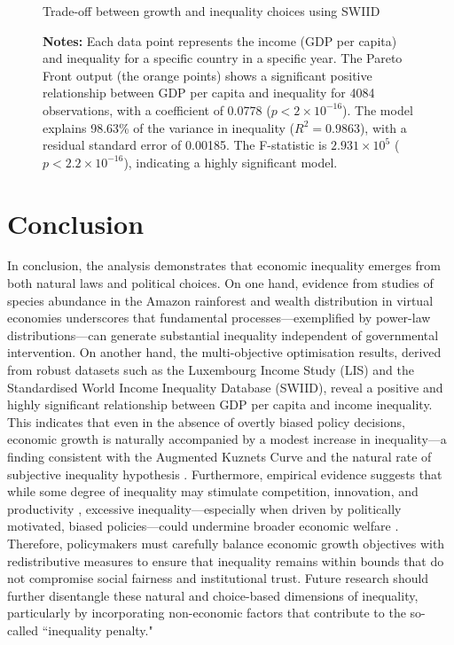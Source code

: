 \documentclass[12pt]{article}
\begin{document}
\begin{figure}[H]
    \centering
    \scalebox{0.6}{}
    \caption{Trade-off between growth and inequality choices using SWIID}
    \label{fig:swiid}
    \captionsetup{font=footnotesize}
    \caption*{\textbf{Notes:} Each data point represents the income (GDP per capita) and inequality for a specific country in a specific year. The Pareto Front output (the orange points) shows a significant positive relationship between GDP per capita and inequality for 4084 observations, with a coefficient of 0.0778 (\( p < 2 \times 10^{-16} \)). The model explains 98.63\% of the variance in inequality (\( R^2 = 0.9863 \)), with a residual standard error of 0.00185. The F-statistic is \( 2.931 \times 10^5 \) (\( p < 2.2 \times 10^{-16} \)), indicating a highly significant model.}
\end{figure}

\section{Conclusion} 

In conclusion, the analysis demonstrates that economic inequality emerges from both natural laws and political choices. On one hand, evidence from studies of species abundance in the Amazon rainforest \parencite{scheffer2017inequality} and wealth distribution in virtual economies \parencite{fuchs2014behavioral} underscores that fundamental processes—exemplified by power-law distributions—can generate substantial inequality independent of governmental intervention. On another hand, the multi-objective optimisation results, derived from robust datasets such as the Luxembourg Income Study (LIS) and the Standardised World Income Inequality Database (SWIID), reveal a positive and highly significant relationship between GDP per capita and income inequality. This indicates that even in the absence of overtly biased policy decisions, economic growth is naturally accompanied by a modest increase in inequality—a finding consistent with the Augmented Kuznets Curve \parencite{conceicao2001toward} and the natural rate of subjective inequality hypothesis \parencite{lambert2003inequality}. Furthermore, empirical evidence suggests that while some degree of inequality may stimulate competition, innovation, and productivity \parencite{balietti2021incentives}, excessive inequality—especially when driven by politically motivated, biased policies—could undermine broader economic welfare \parencite{galbraith2016inequality}. Therefore, policymakers must carefully balance economic growth objectives with redistributive measures to ensure that inequality remains within bounds that do not compromise social fairness and institutional trust. Future research should further disentangle these natural and choice-based dimensions of inequality, particularly by incorporating non-economic factors that contribute to the so-called ``inequality penalty."
\end{document}
